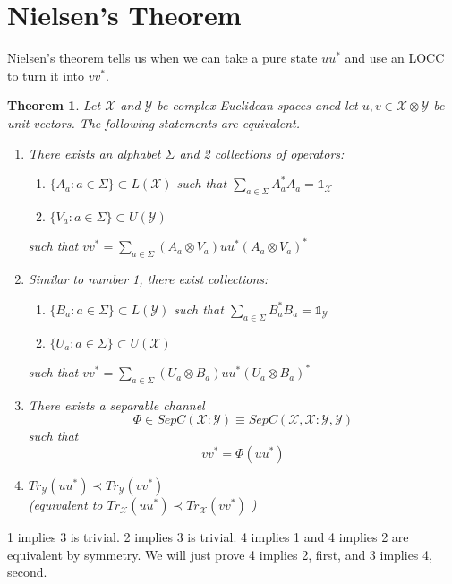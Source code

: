 \documentclass{article}
\newtheorem{theorem}{Theorem}
\begin{document}
\section*{Nielsen's Theorem}
Nielsen's theorem tells us when we can take a pure state $ uu^* $  and use an LOCC to turn
it into $vv^*$.

\begin{theorem}
    Let $\mathcal{X}$ and $ \mathcal{Y} $ be complex Euclidean spaces ancd let $
    u,v \in \mathcal{X}\otimes \mathcal{Y}$  be unit vectors. The following
    statements are equivalent.
    \begin{enumerate}
        \item There exists an alphabet $\Sigma$ and 2 collections of operators:
            \begin{enumerate}
                \item $ \{A_a: a \in \Sigma \} \subset L(\mathcal{X}) $ such that
                    $ \sum_{a\in\Sigma} A_a^* A_a = \mathds{1}_{\mathcal{X}} $
                \item $ \{V_a: a\in \Sigma\} \subset U(\mathcal{Y}) $  
            \end{enumerate}
            such that $vv^* = \sum_{a\in\Sigma} (A_a \otimes V_a) u u^* (A_a
            \otimes V_a)^*$
        \item Similar to number 1, there exist collections:
            \begin{enumerate}
                \item $ \{B_a: a \in \Sigma\} \subset L(\mathcal{Y})$ such that $
                    \sum_{a\in\Sigma} B^*_a B_a = \mathds{1}_{\mathcal{Y}} $
                \item $ \{U_a : a \in \Sigma \} \subset U(\mathcal{X}) $ 
            \end{enumerate}
            such that $ vv^* = \sum_{a\in\Sigma} \left( U_a \otimes B_a
            \right)u u^* \left( U_a \otimes B_a \right)^* $
        \item There exists a separable channel 
            \[ 
                \Phi \in SepC(\mathcal{X}:\mathcal{Y}) \equiv
                SepC(\mathcal{X},\mathcal{X}:\mathcal{Y},\mathcal{Y}) 
            \]
            such that 
            \[ 
                v v^* = \Phi(uu^*) 
            \]
        \item   $ Tr_{\mathcal{Y}} \left( u u^* \right) \prec Tr_{\mathcal{Y}}(vv^*) $
            \\ (equivalent to $ Tr_{\mathcal{X}}\left( uu^* \right) \prec
            Tr_{\mathcal{X}}\left( vv^* \right) $ )
    \end{enumerate}


\end{theorem}
    1 implies 3 is trivial. 2 implies 3 is trivial. 4 implies 1 and 4
    implies 2 are equivalent by symmetry. We will just prove 4 implies 2, first,
    and 3 implies 4, second.
\end{document}
